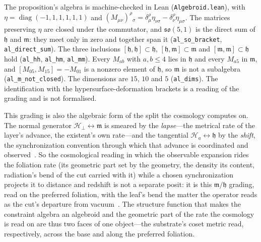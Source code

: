 \documentclass[11pt,a4paper]{article}
\theoremstyle{plain}
\theoremstyle{definition}
\theoremstyle{remark}
\newcommand{\so}{\mathfrak{so}}
\newcommand{\fh}{\mathfrak{h}}
\newcommand{\fm}{\mathfrak{m}}
\newcommand{\Hc}{\mathcal{H}}
\begin{document}
\noindent The proposition's algebra is machine-checked in Lean (\texttt{Algebroid.lean}), with $\eta=\operatorname{diag}(-1,1,1,1,1,1)$ and $(M_{\mu\nu})^{\rho}{}_{\sigma}=\delta^{\rho}_{\mu}\eta_{\nu\sigma}-\delta^{\rho}_{\nu}\eta_{\mu\sigma}$. The matrices preserving $\eta$ are closed under the commutator, and $\so(5,1)$ is the direct sum of $\fh$ and $\fm$: they meet only in zero and together span it (\texttt{al\_so\_bracket}, \texttt{al\_direct\_sum}). The three inclusions $[\fh,\fh]\subset\fh$, $[\fh,\fm]\subset\fm$ and $[\fm,\fm]\subset\fh$ hold (\texttt{al\_hh}, \texttt{al\_hm}, \texttt{al\_mm}). Every $M_{ab}$ with $a,b\le4$ lies in $\fh$ and every $M_{a5}$ in $\fm$, and $[M_{05},M_{15}]=-M_{01}$ is a nonzero element of $\fh$, so $\fm$ is not a subalgebra (\texttt{al\_m\_not\_closed}). The dimensions are $15$, $10$ and $5$ (\texttt{al\_dims}). The identification with the hypersurface-deformation brackets is a reading of the grading and is not formalised.

This grading is also the algebraic form of the split the cosmology computes on. The normal generator $\Hc_\perp\leftrightarrow\fm$ is smeared by the \emph{lapse}---the metrical rate of the layer's advance, the existent's own rate---and the tangential $\Hc_a\leftrightarrow\fh$ by the \emph{shift}, the synchronization convention through which that advance is coordinated and observed~\cite{JanzenModernParallax, JanzenCanonicalTime}. So the cosmological reading in which the observable expansion rides the foliation rate (its geometric part set by the geometry, the density its content, radiation's bend of the cut carried with it) while a chosen synchronization projects it to distance and redshift is not a separate posit: it is this $\fm/\fh$ grading, read on the preferred foliation, with the leaf's bend the matter the operator reads as the cut's departure from vacuum~\cite{JanzenOperator, JanzenCosmogenesis}. The structure function that makes the constraint algebra an algebroid and the geometric part of the rate the cosmology is read on are thus two faces of one object---the substrate's coset metric read, respectively, across the base and along the preferred foliation.
\end{document}
